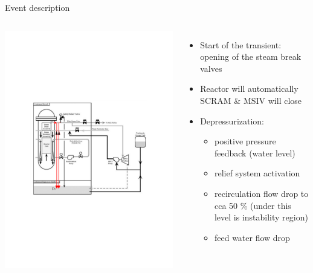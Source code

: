 \begin{frame}{Event description}
	\begin{columns}
		\centering
		\includegraphics[width=0.7\linewidth, trim={3cm 8cm 10cm 9cm}, clip]{./graphs/BWR.pdf}
		\begin{itemize}
			\small
			\item Start of the transient: opening of the steam break valves
			\item Reactor will automatically SCRAM \& MSIV will close
			\item Depressurization:
			\begin{itemize}
				\item positive pressure feedback (water level)
				\item relief system activation
				\item recirculation flow drop to cca 50 \% (under this level is instability region)
				\item feed water flow drop
			\end{itemize}
		
		\end{itemize}
	\end{columns}
\end{frame}
